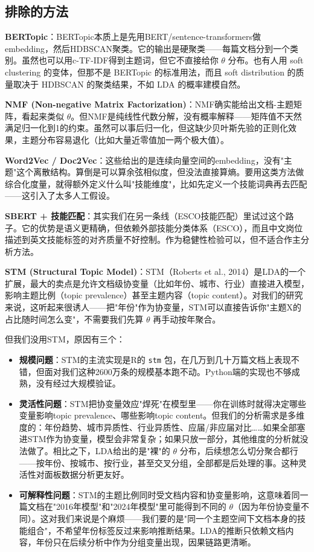 \documentclass[12pt,a4paper]{ctexart}
\begin{document}
\subsection{排除的方法}

\textbf{BERTopic}：BERTopic本质上是先用BERT/sentence-transformers做embedding，然后HDBSCAN聚类。它的输出是硬聚类——每篇文档分到一个类别。虽然也可以用c-TF-IDF得到主题词，但它不直接给你 $\theta$ 分布。也有人用 soft clustering 的变体，但那不是 BERTopic 的标准用法，而且 soft distribution 的质量取决于 HDBSCAN 的聚类结果，不如 LDA 的概率建模自然。

\textbf{NMF (Non-negative Matrix Factorization)}：NMF确实能给出文档-主题矩阵，看起来类似 $\theta$。但NMF是纯线性代数分解，没有概率解释——矩阵值不天然满足归一化到1的约束。虽然可以事后归一化，但这缺少贝叶斯先验的正则化效果，主题分布容易退化（比如大量近零值加一两个极大值）。

\textbf{Word2Vec / Doc2Vec}：这些给出的是连续向量空间的embedding，没有"主题"这个离散结构。算倒是可以算余弦相似度，但没法直接算熵。要用这类方法做综合化度量，就得额外定义什么叫"技能维度"，比如先定义一个技能词典再去匹配——这引入了太多人工假设。

\textbf{SBERT + 技能匹配}：其实我们在另一条线（ESCO技能匹配）里试过这个路子。它的优势是语义更精确，但依赖外部技能分类体系（ESCO），而且中文岗位描述到英文技能标签的对齐质量不好控制。作为稳健性检验可以，但不适合作主分析方法。

\textbf{STM (Structural Topic Model)}：STM（Roberts et al., 2014）是LDA的一个扩展，最大的卖点是允许文档级协变量（比如年份、城市、行业）直接进入模型，影响主题比例（topic prevalence）甚至主题内容（topic content）。对我们的研究来说，这听起来很诱人——把"年份"作为协变量，STM可以直接告诉你"主题X的占比随时间怎么变"，不需要我们先算 $\theta$ 再手动按年聚合。

但我们没用STM，原因有三个：

\begin{itemize}
\item \textbf{规模问题}：STM的主流实现是R的 \texttt{stm} 包，在几万到几十万篇文档上表现不错，但面对我们这种2600万条的规模基本跑不动。Python端的实现也不够成熟，没有经过大规模验证。
\item \textbf{灵活性问题}：STM把协变量效应"焊死"在模型里——你在训练时就得决定哪些变量影响topic prevalence、哪些影响topic content。但我们的分析需求是多维度的：年份趋势、城市异质性、行业异质性、应届/非应届对比……如果全部塞进STM作为协变量，模型会非常复杂；如果只放一部分，其他维度的分析就没法做了。相比之下，LDA给出的是"裸"的 $\theta$ 分布，后续想怎么切分聚合都行——按年份、按城市、按行业，甚至交叉分组，全部都是后处理的事。这种灵活性对面板数据分析更友好。
\item \textbf{可解释性问题}：STM的主题比例同时受文档内容和协变量影响，这意味着同一篇文档在"2016年模型"和"2024年模型"里可能得到不同的 $\theta$（因为年份协变量不同）。这对我们来说是个麻烦——我们要的是"同一个主题空间下文档本身的技能组合"，不希望年份标签反过来影响推断结果。LDA的推断只依赖文档内容，年份只在后续分析中作为分组变量出现，因果链路更清晰。
\end{itemize}
\end{document}
